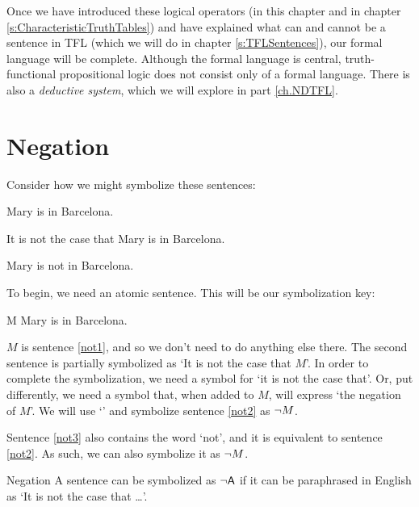 Once we have introduced these logical operators (in this chapter and in chapter \ref{s:CharacteristicTruthTables}) and have explained what can and cannot be a sentence in TFL (which we will do in chapter \ref{s:TFLSentences}), our formal language will be complete. Although the formal language is central, truth-functional propositional logic does not consist only of a formal language. There is also a \textit{deductive system}, which we will explore in part \ref{ch.NDTFL}. 

        
\section{Negation}

Consider how we might symbolize these sentences:
	\begin{earg}
	\item[\ex{not1}] Mary is in Barcelona.
	\item[\ex{not2}] It is not the case that Mary is in Barcelona.
	\item[\ex{not3}] Mary is not in Barcelona.
	\end{earg}
To begin, we need an atomic sentence. This will be our symbolization key:
	\begin{ekey}
		\item[M] Mary is in Barcelona.
	\end{ekey}
	
$M$ is sentence \ref{not1}, and so we don't need to do anything else there. 
The second sentence is partially symbolized as `It is not the case that $M$'. In order to complete the symbolization, we need a symbol for `it is not the case that'. Or, put differently, we need a symbol that, when added to $M$, will express `the negation of $M$'. We will use `\enot' and symbolize sentence \ref{not2} as ${\neg} M$.

Sentence \ref{not3} also contains the word `not', and it is equivalent to sentence \ref{not2}. As such, we can also symbolize it as ${\neg} M$.

\begin{factboxy}{Negation}
A sentence can be symbolized as ${\neg}\mathsf{A}$ if it can be paraphrased in English as `It is not the case that \ldots'.
\end{factboxy}

